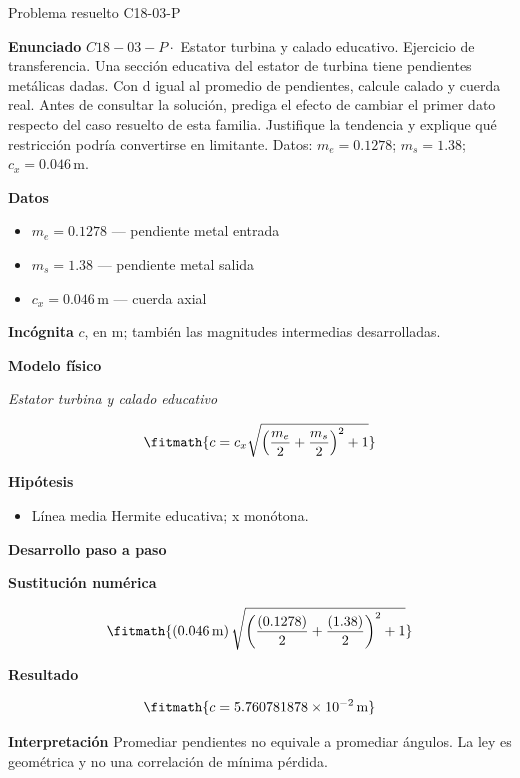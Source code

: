 \documentclass[10pt,openany]{book}
\begin{document}
\begin{studiumworked}{Problema resuelto C18-03-P}


\noindent\textbf{Enunciado}
\(C18-03-P \cdot\) Estator turbina y calado educativo. Ejercicio de transferencia. Una sección educativa del estator de turbina tiene pendientes metálicas dadas. Con d igual al promedio de pendientes, calcule calado y cuerda real. Antes de consultar la solución, prediga el efecto de cambiar el primer dato respecto del caso resuelto de esta familia. Justifique la tendencia y explique qué restricción podría convertirse en limitante. Datos: \(m_e=0.1278\); \(m_s=1.38\); \(c_x=0.046\, \mathrm{m}\).

\noindent\textbf{Datos}
\begin{itemize}
\item $m_e = 0.1278$ — pendiente metal entrada
\item $m_s = 1.38$ — pendiente metal salida
\item $c_x = 0.046\,\mathrm{m}$ — cuerda axial
\end{itemize}

\noindent\textbf{Incógnita}
$c$, en $\mathrm{m}$; también las magnitudes intermedias desarrolladas.

\noindent\textbf{Modelo físico}

\noindent\textit{Estator turbina y calado educativo}

\[
\fitmath{c=c_x \sqrt{\left(\frac{m_e}{2} + \frac{m_s}{2}\right)^{2} + 1}}
\]

\noindent\textbf{Hipótesis}
\begin{itemize}
\item Línea media Hermite educativa; x monótona.
\end{itemize}

\noindent\textbf{Desarrollo paso a paso}



\noindent\textbf{Sustitución numérica}

\[
\fitmath{\left(0.046\,\mathrm{m}\right) \sqrt{\left(\frac{\left(0.1278\right)}{2} + \frac{\left(1.38\right)}{2}\right)^{2} + 1}}
\]

\noindent\textbf{Resultado}

\[
\fitmath{c=5.760781878\times10^{-2}\,\mathrm{m}}
\]

\noindent\textbf{Interpretación}
Promediar pendientes no equivale a promediar ángulos. La ley es geométrica y no una correlación de mínima pérdida.


\end{studiumworked}
\end{document}
